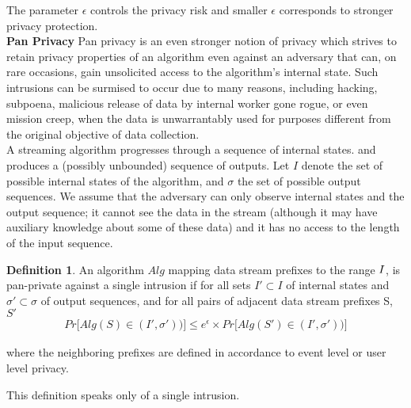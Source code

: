 \documentclass{article}
\theoremstyle{definition}
\newtheorem{definition}{Definition}[section]
\begin{document}
The parameter $\epsilon$ controls the privacy risk and smaller $\epsilon$ corresponds
to stronger privacy protection. \\\textbf{Pan Privacy}  Pan privacy is an even stronger notion of privacy which strives to retain privacy properties of an algorithm even against an adversary that can, on rare occasions, gain unsolicited access to the  algorithm's internal state. Such intrusions can be surmised to occur due to many reasons, including hacking, subpoena, malicious release of data by internal worker gone rogue, or even mission creep, when the data is unwarrantably used for purposes different from the original objective of data collection.\\ A streaming algorithm progresses through a sequence of internal states.
and produces a (possibly unbounded) sequence of outputs. Let $I$ denote
the set of possible internal states of the algorithm, and $\sigma$ the set of
possible output sequences. We assume that the adversary can only
observe internal states and the output sequence; it cannot see the
data in the stream (although it may have auxiliary knowledge about
some of these data) and it has no access to the length of the input
sequence. \begin{definition} An algorithm $Alg$ mapping data stream
prefixes to the range $I \time \sigma$, is pan-private against a single intrusion
if for all sets $I' \subset I$ of internal states and $\sigma ' \subset \sigma$ of output sequences,
and for all pairs of adjacent data stream prefixes S, $S'$\begin{gather}Pr\Big[Alg(S) \in (I',\sigma'))\Big]\leq e^{\epsilon} \times Pr\Big[Alg(S') \in (I',\sigma'))\Big]\end{gather}

where the neighboring prefixes are defined in accordance to event level or user level privacy.\end{definition}
This definition speaks only of a single intrusion. 





 
 
\end{document}
